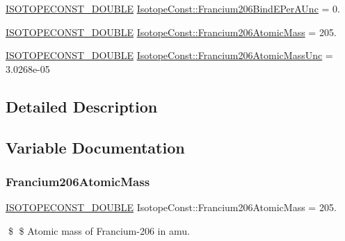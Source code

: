 \begin{DoxyCompactItemize}
\mbox{\hyperlink{group___isotope_const-_macros_ga8f45a7272ce02c0b4c65c44636ed719a}{I\+S\+O\+T\+O\+P\+E\+C\+O\+N\+S\+T\+\_\+\+D\+O\+U\+B\+LE}} \mbox{\hyperlink{group___isotope_const-_francium-_fr206_gaef6434f20731abd2ea5267df74d5144c}{Isotope\+Const\+::\+Francium206\+Bind\+E\+Per\+A\+Unc}} = 0.
\item 
\mbox{\hyperlink{group___isotope_const-_macros_ga8f45a7272ce02c0b4c65c44636ed719a}{I\+S\+O\+T\+O\+P\+E\+C\+O\+N\+S\+T\+\_\+\+D\+O\+U\+B\+LE}} \mbox{\hyperlink{group___isotope_const-_francium-_fr206_ga11220066fe384372a0ec7667d9de4411}{Isotope\+Const\+::\+Francium206\+Atomic\+Mass}} = 205.
\item 
\mbox{\hyperlink{group___isotope_const-_macros_ga8f45a7272ce02c0b4c65c44636ed719a}{I\+S\+O\+T\+O\+P\+E\+C\+O\+N\+S\+T\+\_\+\+D\+O\+U\+B\+LE}} \mbox{\hyperlink{group___isotope_const-_francium-_fr206_ga3027b3a0e5a6f4cabaffc2eb51446217}{Isotope\+Const\+::\+Francium206\+Atomic\+Mass\+Unc}} = 3.\+0268e-\/05
\end{DoxyCompactItemize}


\subsection{Detailed Description}


\subsection{Variable Documentation}
\mbox{\label{group___isotope_const-_francium-_fr206_ga11220066fe384372a0ec7667d9de4411}} 
\subsubsection{\texorpdfstring{Francium206\+Atomic\+Mass}{Francium206AtomicMass}}
{\footnotesize\ttfamily \mbox{\hyperlink{group___isotope_const-_macros_ga8f45a7272ce02c0b4c65c44636ed719a}{I\+S\+O\+T\+O\+P\+E\+C\+O\+N\+S\+T\+\_\+\+D\+O\+U\+B\+LE}} Isotope\+Const\+::\+Francium206\+Atomic\+Mass = 205.}

\$ \$ Atomic mass of Francium-\/206 in amu. \mbox{\label{group___isotope_const-_francium-_fr206_ga3027b3a0e5a6f4cabaffc2eb51446217}} 
